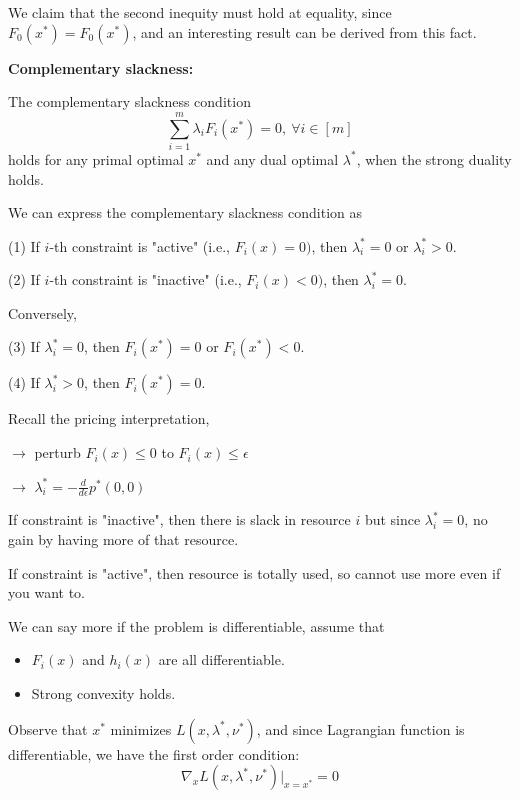 We claim that the second inequity must hold at equality, since $F_0(x^*)=F_0(x^*)$, and an interesting result can be derived from this fact.


\vspace{0.3cm}
\textbf{Complementary slackness:}

The complementary slackness condition
$$\sum^m_{i=1}\lambda_iF_i(x^*)=0,\ \forall i\in [m]$$
holds for any primal optimal $x^*$ and any dual optimal $\lambda^*$, when the strong duality holds.

We can express the complementary slackness condition as

	(1) If $i$-th constraint is "active" (i.e., $F_i(x)=0)$, then $\lambda_i^*=0$ or $\lambda_i^*>0$.
	
	(2) If $i$-th constraint is "inactive" (i.e., $F_i(x)<0)$, then $\lambda_i^*=0$.

Conversely,

	(3) If $\lambda_i^*=0$, then $F_i(x^*)=0$ or $F_i(x^*)<0$.
	
	(4) If $\lambda_i^*>0$, then $F_i(x^*)=0$.

\vspace{0.5cm}
Recall the pricing interpretation,

$\rightarrow$ perturb $F_i(x)\leq 0$ to $F_i(x)\leq \epsilon$

$\rightarrow$ $\lambda_i^* = - \frac{d}{d\epsilon}p^*(0,0)$


If constraint is "inactive", then there is slack in resource $i$ but since $\lambda_i^* = 0$, no gain by having more of that resource.

If constraint is "active", then resource is totally used, so cannot use more even if you want to.


\vspace{0.5cm}
We can say more if the problem is differentiable, assume that
\begin{itemize}
	\item $F_i(x)$ and $h_i(x)$ are all differentiable.
	
	\item Strong convexity holds.
\end{itemize}

Observe that $x^*$ minimizes $L(x,\lambda^*,\nu^*)$, and since Lagrangian function is differentiable, we have the first order condition:
\begin{equation*}
\nabla_x L(x,\lambda^*,\nu^*) {\vert}_{x=x^*} = 0
\end{equation*}

